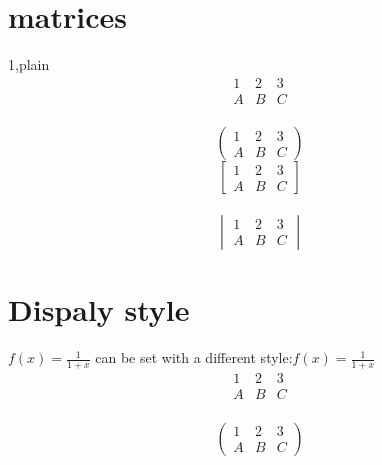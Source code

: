 \documentclass[12pt]{book}
\begin{document}
\section{matrices}
1,plain\\
$$
\begin{matrix}
1 & 2 & 3 \\
A & B & C
\end{matrix}
$$ \\
$$
\begin{pmatrix}
1 & 2 & 3 \\
A & B & C
\end{pmatrix}
$$
$$
\begin{bmatrix}
1 & 2 & 3 \\
A & B & C
\end{bmatrix}
$$\\

$$
\begin{vmatrix}
1 & 2 & 3 \\
A & B & C

\end{vmatrix}
$$
\section{Dispaly style}
$f(x)=\frac{1}{1+x} $ can be set with a different style:$ f(x)=\displaystyle\frac{1}{1+x} $
$$\begin{matrix}
1 & 2 & 3 \\
A & B & C
\end{matrix}
$$ \\
$$
\begin{pmatrix}
1 & 2 & 3 \\
A & B & C
\end{pmatrix}
$$
\end{document}
